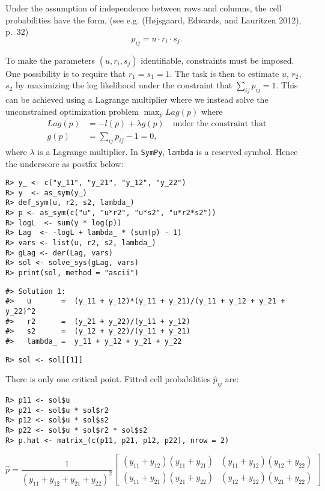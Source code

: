 Under the assumption of independence between rows and columns, the cell
probabilities have the form, (see e.g. (Højsgaard, Edwards, and Lauritzen 2012), p.~32)
\[
p_{ij}=u \cdot r_i \cdot s_j.
\]

To make the parameters \((u, r_i, s_j)\) identifiable, constraints
must be imposed. One possibility is to require that \(r_1=s_1=1\). The
task is then to estimate \(u\), \(r_2\), \(s_2\) by maximizing the log likelihood
under the constraint that \(\sum_{ij} p_{ij} = 1\). This can be
achieved using a Lagrange multiplier where we instead solve the
unconstrained optimization problem \(\max_p Lag(p)\) where
\begin{align}
  Lag(p) &= -l(p) + \lambda g(p) \quad \text{under the constraint that} \\
  g(p) &= \sum_{ij} p_{ij} - 1 = 0 ,
\end{align}
where \(\lambda\) is a Lagrange multiplier.
In \texttt{SymPy}, \texttt{lambda} is a reserved symbol. Hence the underscore as postfix below:

\begin{verbatim}
R> y_ <- c("y_11", "y_21", "y_12", "y_22")
R> y  <- as_sym(y_)
R> def_sym(u, r2, s2, lambda_)
R> p <- as_sym(c("u", "u*r2", "u*s2", "u*r2*s2"))
R> logL  <- sum(y * log(p))
R> Lag  <- -logL + lambda_ * (sum(p) - 1) 
R> vars <- list(u, r2, s2, lambda_)
R> gLag <- der(Lag, vars)
R> sol <- solve_sys(gLag, vars)
R> print(sol, method = "ascii")
\end{verbatim}

\begin{verbatim}
#> Solution 1:
#>   u       =  (y_11 + y_12)*(y_11 + y_21)/(y_11 + y_12 + y_21 + y_22)^2 
#>   r2      =  (y_21 + y_22)/(y_11 + y_12) 
#>   s2      =  (y_12 + y_22)/(y_11 + y_21) 
#>   lambda_ =  y_11 + y_12 + y_21 + y_22
\end{verbatim}

\begin{verbatim}
R> sol <- sol[[1]]
\end{verbatim}

There is only one critical point. Fitted cell probabilities \(\hat p_{ij}\) are:

\begin{verbatim}
R> p11 <- sol$u
R> p21 <- sol$u * sol$r2
R> p12 <- sol$u * sol$s2
R> p22 <- sol$u * sol$r2 * sol$s2
R> p.hat <- matrix_(c(p11, p21, p12, p22), nrow = 2)
\end{verbatim}

\[
\hat p = \frac{1}{\left(y_{11} + y_{12} + y_{21} + y_{22}\right)^{2}}  \left[\begin{matrix}\left(y_{11} + y_{12}\right) \left(y_{11} + y_{21}\right) & \left(y_{11} + y_{12}\right) \left(y_{12} + y_{22}\right)\\\left(y_{11} + y_{21}\right) \left(y_{21} + y_{22}\right) & \left(y_{12} + y_{22}\right) \left(y_{21} + y_{22}\right)\end{matrix}\right]
\]


